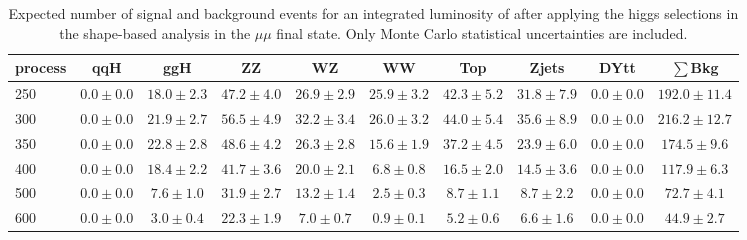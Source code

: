 \begin{table}
{\footnotesize
 \begin{center}
 \begin{tabular}{l | c c |  c c c c c c c }
 \hline
 process & qqH & ggH & ZZ & WZ & WW & Top & Zjets & DYtt & $\sum$Bkg \\
 \hline
250 & $0.0\pm0.0$ & $18.0\pm2.3$ & $47.2\pm4.0$ & $26.9\pm2.9$ & $25.9\pm3.2$ & $42.3\pm5.2$ & $31.8\pm7.9$ & $0.0\pm0.0$ & $192.0\pm11.4$ \\
300 & $0.0\pm0.0$ & $21.9\pm2.7$ & $56.5\pm4.9$ & $32.2\pm3.4$ & $26.0\pm3.2$ & $44.0\pm5.4$ & $35.6\pm8.9$ & $0.0\pm0.0$ & $216.2\pm12.7$ \\
350 & $0.0\pm0.0$ & $22.8\pm2.8$ & $48.6\pm4.2$ & $26.3\pm2.8$ & $15.6\pm1.9$ & $37.2\pm4.5$ & $23.9\pm6.0$ & $0.0\pm0.0$ & $174.5\pm9.6$ \\
400 & $0.0\pm0.0$ & $18.4\pm2.2$ & $41.7\pm3.6$ & $20.0\pm2.1$ & $6.8\pm0.8$ & $16.5\pm2.0$ & $14.5\pm3.6$ & $0.0\pm0.0$ & $117.9\pm6.3$ \\
500 & $0.0\pm0.0$ & $7.6\pm1.0$ & $31.9\pm2.7$ & $13.2\pm1.4$ & $2.5\pm0.3$ & $8.7\pm1.1$ & $8.7\pm2.2$ & $0.0\pm0.0$ & $72.7\pm4.1$ \\
600 & $0.0\pm0.0$ & $3.0\pm0.4$ & $22.3\pm1.9$ & $7.0\pm0.7$ & $0.9\pm0.1$ & $5.2\pm0.6$ & $6.6\pm1.6$ & $0.0\pm0.0$ & $44.9\pm2.7$ \\
\hline
\end{tabular}
\end{center}
}
\caption{\fixme Expected number of signal and background events for an 
  integrated luminosity of \intlumi after applying the higgs selections in the shape-based analysis in the $\mu\mu$ final state. 
  Only Monte Carlo statistical uncertainties are included. }
\label{tab:yield_shapebased_mm}
\end{table}
